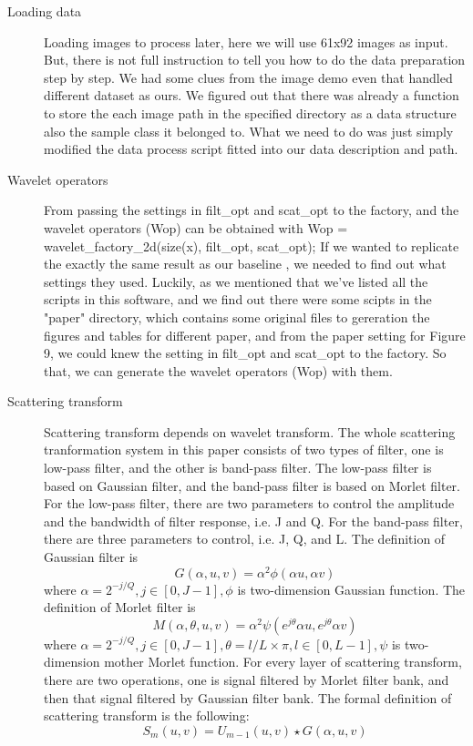 \documentclass[final,leqno,onefignum,onetabnum]{siamltexmm}
\begin{document}
\begin{description}
	\item[Loading data] 
	Loading images to process later, here we will use 61x92 images as input. But, there is not full instruction to tell you how to do the data preparation step by step. We had some clues from the image demo \cite{baseline_software} even that handled different dataset as ours. We figured out that there was already a function to store the each image path in the specified directory as a data structure also the sample class it belonged to. What we need to do was just simply modified the data process script fitted into our data description and path. \cite{github_data}
	\item[Wavelet operators] 
	From passing the settings in filt\_opt and scat\_opt to the factory, and the wavelet operators (Wop) can be obtained with 
	Wop = wavelet\_factory\_2d(size(x), filt\_opt, scat\_opt); If we wanted to replicate the exactly the same result as our baseline \cite{baseline}, we needed to find out what settings they used. Luckily, as we mentioned that we've listed all the scripts in this software, and we find out there were some scipts in the "paper" directory, which contains some original files to gereration the figures and tables for different paper, and from the paper \cite{baseline} setting for Figure 9, we could knew the setting in filt\_opt and scat\_opt to the factory. So that, we can generate the wavelet operators (Wop) with them.
	\item[Scattering transform] 
	Scattering transform depends on wavelet transform. The whole scattering tranformation system in this paper consists of two types of filter, one is low-pass filter, and the other is band-pass filter. The low-pass filter is based on Gaussian filter, and the band-pass filter is based on Morlet filter. For the low-pass filter, there are two parameters to control the amplitude and the bandwidth of filter response, i.e. J and Q. For the band-pass filter, there are three parameters to control, i.e. J, Q, and L. The definition of Gaussian filter is
	\begin{equation}
		G(\alpha, u, v) = \alpha^2\phi(\alpha u, \alpha v)
	\end{equation}
	where $\alpha = 2^{-j/Q}, j \in [0, J-1], \phi $ is two-dimension Gaussian function.
	The definition of Morlet filter is
	\begin{equation}
		M(\alpha, \theta, u, v) = \alpha^2\psi(e^{j\theta} \alpha u, e^{j\theta}\alpha v)
	\end{equation}
	where $\alpha = 2^{-j/Q}, j \in [0, J-1], \theta = l/L \times \pi, l \in [0, L-1], \psi $ is two-dimension mother Morlet function.
	For every layer of scattering transform, there are two operations, one is signal filtered by Morlet filter bank, and then that signal filtered by Gaussian filter bank. The formal definition of scattering transform is the following:
	\begin{equation}
		S_m(u,v) = U_{m-1}(u,v) \star G(\alpha, u, v)
	\end{equation}
	

\end{description}
\end{document}
